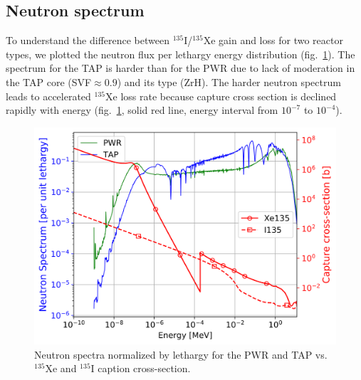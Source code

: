 \documentclass{anstrans}
\begin{document}
\subsection{Neutron spectrum}
To understand the  difference between $^{135}$I/$^{135}$Xe gain and loss for 
two reactor types, we plotted the neutron flux per lethargy energy 
distribution (fig.~\ref{fig:spectrum}). The spectrum for the \gls{TAP} is 
harder than for the \gls{PWR} due to lack of moderation in the \gls{TAP} core 
(\gls{SVF}$\approx0.9$) and its type (ZrH). The harder neutron spectrum leads 
to accelerated $^{135}$Xe loss rate because capture cross section is declined 
rapidly with energy (fig.~\ref{fig:spectrum}, solid red line, energy interval 
from $10^{-7}$ to $10^{-4}$).
\begin{figure}[htbp!] %
        \centering
        \includegraphics[width=1.07\linewidth]{spectra.png}
	        \vspace{-0.2in}
        \caption{Neutron spectra normalized by lethargy for the \gls{PWR} and 
        \gls{TAP} vs. $^{135}$Xe and $^{135}$I 
        caption cross-section.}
        	\vspace{-0.19in}
        \label{fig:spectrum}
\end{figure}
\end{document}
